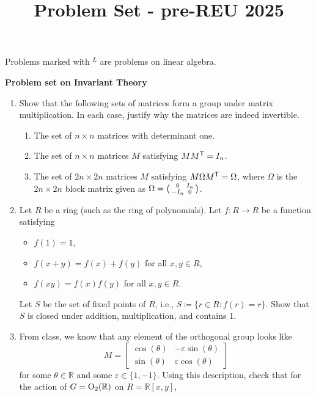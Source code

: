 \documentclass[12pt]{article}
\title{Problem Set - pre-REU 2025}
\author{}
\date{}
\begin{document}
\maketitle

Problems marked with ${}^{L}$ are problems on linear algebra. 

\textbf{Problem set on Invariant Theory}

\begin{enumerate}[label=\arabic*., leftmargin=*]
	\item Show that the following sets of matrices form a group under matrix multiplication. 
	In each case, justify why the matrices are indeed invertible.
	\begin{enumerate}[label=(\alph*)]
		\item The set of $n \times n$ matrices with determinant one. 
		\item The set of $n \times n$ matrices $M$ satisfying 
		$M M^{\mathsf{T}} = I_{n}$.
		\item The set of $2n \times 2n$ matrices $M$ satisfying 
		$M \Omega M^{\mathsf{T}} = \Omega$, 
		where $\Omega$ is the $2n \times 2n$ block matrix given as 
		$\Omega = \left(\begin{smallmatrix} 0 & I_{n} \\ -I_{n} & 0 \end{smallmatrix}\right)$. 
	\end{enumerate}
	\item Let $R$ be a ring (such as the ring of polynomials). 
	Let $f \colon R \to R$ be a function satisfying 
	\begin{itemize}
		\item $f(1) = 1$, 
		\item $f(x + y) = f(x) + f(y)$ for all $x, y \in R$, 
		\item $f(x y) = f(x) f(y)$ for all $x, y \in R$.
	\end{itemize}
	Let $S$ be the set of fixed points of $R$, i.e., 
	$S \coloneqq \{r \in R : f(r) = r\}$. 
	Show that $S$ is closed under addition, multiplication, and contains $1$. 
	\item From class, we know that any element of the orthogonal group looks like
	\begin{equation*} 
		M = 
		\begin{bmatrix}
			\cos(\theta) & - \varepsilon \sin(\theta) \\
			\sin(\theta) & \varepsilon \cos(\theta)
		\end{bmatrix}
	\end{equation*}
	for some $\theta \in \mathbb{R}$ and some $\varepsilon \in \{1, -1\}$. 
	Using this description, check that for the action of $G = \operatorname{O}_{2}(\mathbb{R})$ on $R = \mathbb{R}\left[x, y\right]$, 

\end{enumerate}
\end{document}
